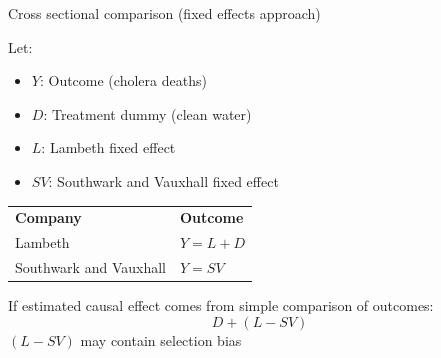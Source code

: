 \documentclass[compress, 8pt]{beamer}
\begin{document}
\begin{frame}{Cross sectional comparison (fixed effects approach)}

Let:
\begin{itemize}
    \item $Y$: Outcome (cholera deaths)
    \item $D$: Treatment dummy (clean water)
    \item $L$: Lambeth fixed effect
    \item $SV$: Southwark and Vauxhall fixed effect
\end{itemize}
\begin{table}
\begin{tabular}{ll}
\textbf{Company} &\textbf{Outcome} \\
Lambeth & $Y = L + D$ \\
Southwark and Vauxhall & $Y = SV$
\end{tabular}
\end{table}
If estimated causal effect comes from simple comparison of outcomes:
\begin{equation*}
    D + (L - SV)
\end{equation*}
$(L - SV)$ may contain selection bias

\end{frame}
\end{document}
